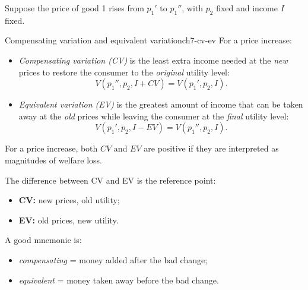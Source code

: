 Suppose the price of good 1 rises from $p_1'$ to $p_1''$, with $p_2$ fixed and income $I$ fixed.

\begin{definition}{Compensating variation and equivalent variation}{ch7-cv-ev}
For a price increase:
\begin{itemize}
    \item \emph{Compensating variation (CV)} is the least extra income needed at the \emph{new} prices to restore the consumer to the \emph{original} utility level:
    \[
    V(p_1'',p_2, I+CV)=V(p_1',p_2,I).
    \]
    \item \emph{Equivalent variation (EV)} is the greatest amount of income that can be taken away at the \emph{old} prices while leaving the consumer at the \emph{final} utility level:
    \[
    V(p_1',p_2, I-EV)=V(p_1'',p_2,I).
    \]
\end{itemize}
\end{definition}

For a price increase, both $CV$ and $EV$ are positive if they are interpreted as magnitudes of welfare loss.

\begin{examtip}
The difference between CV and EV is the reference point:
\begin{itemize}
    \item \textbf{CV:} new prices, old utility;
    \item \textbf{EV:} old prices, new utility.
\end{itemize}
A good mnemonic is:
\begin{itemize}
    \item \emph{compensating} = money added after the bad change;
    \item \emph{equivalent} = money taken away before the bad change.
\end{itemize}
\end{examtip}


